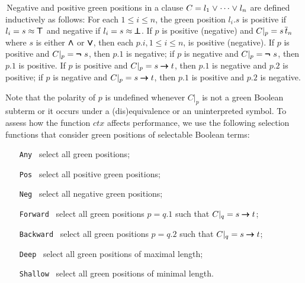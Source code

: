 \documentclass[smallcondensed,draft]{svjour3}     %
\begin{document}
\begin{definitionx}
 \,Negative and positive green positions in a clause $C = l_1 \mathrel\lor \cdots \mathrel\lor
 l_n$ are defined inductively as follows: For each
 $1 \leq i \leq n$, the green position $l_i.s$ is positive if $l_i = s \approx \pmb\top$ and negative if $l_i
 = s \approx \pmb\bot$. If $p$ is positive (negative) and $C|_p = s \,
 \overline{t}_{n}$ where $s$ is either $\pmb\land$ or $\pmb\lor$, then each
 $p.i, 1 \leq i \leq n$, is positive (negative). If $p$ is positive and $C|_p =
 \pmb{\neg\,} \, s$, then $p.1$ is negative; if $p$ is negative and $C|_p = \pmb{\neg\,} \, s$,
 then $p.1$ is positive. If $p$ is positive and $C|_p = s \pmb\rightarrow t$, then
 $p.1$ is negative and $p.2$ is positive; if $p$ is negative and $C|_p = s
 \pmb\rightarrow t$, then $p.1$ is positive and $p.2$ is negative.
\end{definitionx}
Note that the polarity of $p$ is undefined whenever $C|_p$ is not a green Boolean subterm
or it occurs under a (dis)equivalence or an uninterpreted symbol.
To assess how the function $\mathit{ctx}$ affects performance, we use the following
selection functions that consider green positions of selectable Boolean terms:
%
\begin{enumerate}
  \item[\rm\texttt{Any}~] select all green positions;
  \item[\rm\texttt{Pos}~] select all positive green positions;
  \item[\rm\texttt{Neg}~] select all negative green positions;
  \item[\rm\texttt{Forward}~] select all green positions $p = q.1$ such that $C|_q = s \pmb\rightarrow t$;
  \item[\rm\texttt{Backward}~] select all green positions $p = q.2$ such that $C|_q = s \pmb\rightarrow t$;
  \item[\rm\texttt{Deep}~] select all green positions of maximal length;
  \item[\rm\texttt{Shallow}~] select all green positions of minimal length.
\end{enumerate}
\end{document}
